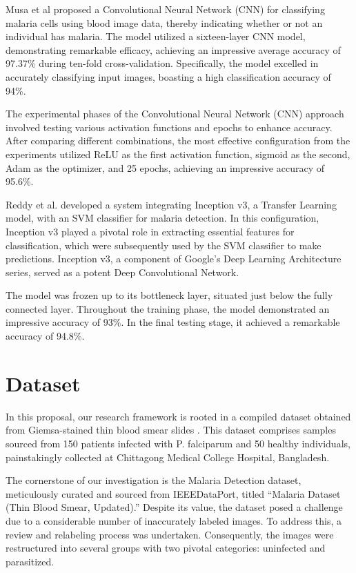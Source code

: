\documentclass[journal,12pt,onecolumn,draftcls]{IEEEtran}
\begin{document}
Musa et al \cite{musa2022} proposed a Convolutional Neural Network (CNN) for classifying malaria cells using blood image data, thereby indicating whether or not an individual has malaria. The model utilized a sixteen-layer CNN model, demonstrating remarkable efficacy, achieving an impressive average accuracy of 97.37\% during ten-fold cross-validation. Specifically, the model excelled in accurately classifying input images, boasting a high classification accuracy of 94\%.

The experimental phases of the Convolutional Neural Network (CNN) approach involved testing various activation functions and epochs to enhance accuracy. After comparing different combinations, the most effective configuration from the experiments utilized ReLU as the first activation function, sigmoid as the second, Adam as the optimizer, and 25 epochs, achieving an impressive accuracy of 95.6\%.

Reddy et al. \cite{reddy2021} developed a system integrating Inception v3, a Transfer Learning model, with an SVM classifier for malaria detection. In this configuration, Inception v3 played a pivotal role in extracting essential features for classification, which were subsequently used by the SVM classifier to make predictions. Inception v3, a component of Google's Deep Learning Architecture series, served as a potent Deep Convolutional Network.

The model was frozen up to its bottleneck layer, situated just below the fully connected layer. Throughout the training phase, the model demonstrated an impressive accuracy of 93\%. In the final testing stage, it achieved a remarkable accuracy of 94.8\%.

\section{Dataset}
In this proposal, our research framework is rooted in a compiled dataset obtained from Giemsa-stained thin blood smear slides \cite{chakradeo2020}. This dataset comprises samples sourced from 150 patients infected with P. falciparum and 50 healthy individuals, painstakingly collected at Chittagong Medical College Hospital, Bangladesh.

The cornerstone of our investigation is the Malaria Detection dataset, meticulously curated and sourced from IEEEDataPort, titled ``Malaria Dataset (Thin Blood Smear, Updated).'' Despite its value, the dataset posed a challenge due to a considerable number of inaccurately labeled images. To address this, a review and relabeling process was undertaken. Consequently, the images were restructured into several groups with two pivotal categories: uninfected and parasitized.
\end{document}
